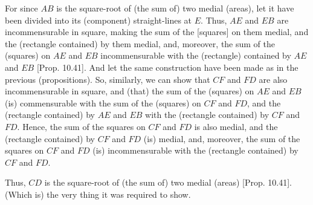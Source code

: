 \begin{Parallel}{}{}
{For since $AB$ is the square-root of (the sum of) two medial (areas),
let it have been divided into its (component) straight-lines at $E$.
Thus, $AE$ and $EB$ are incommensurable in square, making the sum of
the [squares] on them medial, and the (rectangle contained) by them
medial, and, moreover, the sum of the (squares) on $AE$ and $EB$
incommensurable with the (rectangle) contained by $AE$ and $EB$ [Prop. 10.41]. And let the same construction
have been made as in the previous (propositions). So, similarly, we
can show that $CF$ and $FD$ are also incommensurable in square,
and (that) the sum of the (squares) on $AE$ and $EB$ (is)
commensurable with the sum of the (squares) on $CF$ and $FD$, and the
(rectangle contained) by $AE$ and $EB$ with the (rectangle contained)
by $CF$ and $FD$. Hence, the sum of the squares on $CF$ and
$FD$ is also medial, and the (rectangle contained) by $CF$ and $FD$
(is) medial, and, moreover, the sum of the squares on $CF$ and $FD$
(is) incommensurable with the (rectangle contained) by $CF$ and $FD$.

Thus, $CD$ is the square-root of (the sum of) two medial (areas) [Prop. 10.41].
(Which is) the very thing it was required to show.}
\end{Parallel}

